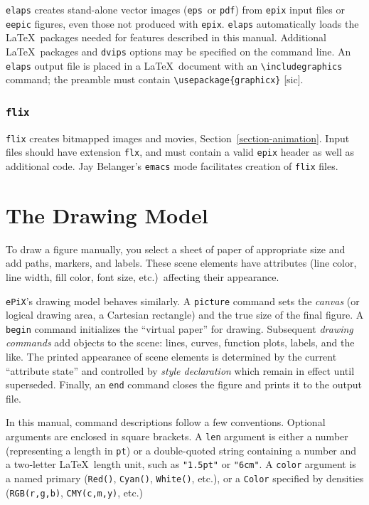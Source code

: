 \documentclass[12pt,letterpaper]{book}
\newcommand{\code}[1]{\texttt{#1}}
\newcommand{\filename}[1]{\texttt{#1}}
\newcommand{\ePiX}{\code{ePiX}}
\begin{document}
\code{elaps} creates stand-alone vector images (\filename{eps}~or
\filename{pdf}) from \code{epix} input files or \filename{eepic}
figures, even those not produced with \code{epix}.  \code{elaps}
automatically loads the \LaTeX\ packages needed for features described
in this manual. Additional \LaTeX\ packages and \code{dvips} options
may be specified on the command line.  An \code{elaps} output file is
placed in a \LaTeX\ document with an \verb+\includegraphics+ command;
the preamble must contain \verb+\usepackage{graphicx}+ [sic].


\subsubsection*{\code{flix}}

\code{flix} creates bitmapped images and movies,
Section~\ref{section-animation}. Input files should have extension
\filename{flx}, and must contain a valid \code{epix} header as well as
additional code. Jay Belanger's \code{emacs} mode facilitates creation
of \code{flix} files.


\section{The Drawing Model}
\label{section-overview}

To draw a figure manually, you select a sheet of paper of appropriate
size and add paths, markers, and labels. These scene elements have
attributes (line color, line width, fill color, font size, etc.)\
affecting their appearance. 

%
\ePiX's drawing model behaves similarly.  A \code{picture} command
sets the \emph{canvas} (or logical drawing area, a Cartesian
rectangle) and the true size of the final figure. A \code{begin}
command initializes the ``virtual paper'' for drawing. Subsequent
\emph{drawing commands} add objects to the scene: lines, curves,
function plots, labels, and the like. The printed appearance of scene
elements is determined by the current ``attribute state'' and
controlled by \emph{style declaration} which remain in effect until
superseded. Finally, an \code{end} command closes the figure and
prints it to the output file.

In this manual, command descriptions follow a few
conventions. Optional arguments are enclosed in square brackets. A
\code{len} argument is either a number (representing a length in
\code{pt}) or a double-quoted string containing a number and a
two-letter \LaTeX\ length unit, such as \code{"1.5pt"} or
\code{"6cm"}.  A \code{color} argument is a named primary
(\code{Red()}, \code{Cyan()}, \code{White()}, etc.), or a \code{Color}
specified by densities (\code{RGB(r,g,b)}, \code{CMY(c,m,y)}, etc.)
\end{document}
